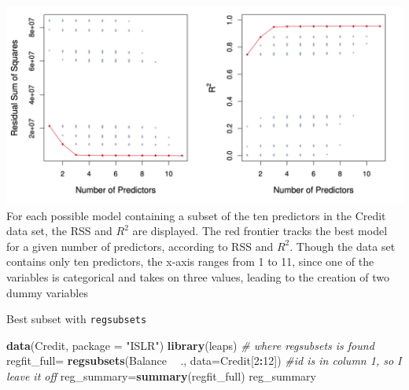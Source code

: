 \documentclass[
]{article}
\newenvironment{Shaded}{\begin{snugshade}}{\end{snugshade}}
\newcommand{\CommentTok}[1]{\textcolor[rgb]{0.56,0.35,0.01}{\textit{#1}}}
\newcommand{\DataTypeTok}[1]{\textcolor[rgb]{0.13,0.29,0.53}{#1}}
\newcommand{\DecValTok}[1]{\textcolor[rgb]{0.00,0.00,0.81}{#1}}
\newcommand{\KeywordTok}[1]{\textcolor[rgb]{0.13,0.29,0.53}{\textbf{#1}}}
\newcommand{\NormalTok}[1]{#1}
\newcommand{\OperatorTok}[1]{\textcolor[rgb]{0.81,0.36,0.00}{\textbf{#1}}}
\newcommand{\StringTok}[1]{\textcolor[rgb]{0.31,0.60,0.02}{#1}}
\begin{document}
\includegraphics[width=33.39in]{images/6.1} For each possible model
containing a subset of the ten predictors in the Credit data set, the
RSS and \(R^2\) are displayed. The red frontier tracks the best model
for a given number of predictors, according to RSS and \(R^2\). Though
the data set contains only ten predictors, the x-axis ranges from 1 to
11, since one of the variables is categorical and takes on three values,
leading to the creation of two dummy variables

Best subset with \texttt{regsubsets}

\begin{Shaded}
\begin{Highlighting}[]
\KeywordTok{data}\NormalTok{(Credit, }\DataTypeTok{package =} \StringTok{"ISLR"}\NormalTok{)}
\KeywordTok{library}\NormalTok{(leaps) }\CommentTok{# where regsubsets is found}
\NormalTok{regfit_full=}\StringTok{ }\KeywordTok{regsubsets}\NormalTok{(Balance }\OperatorTok{~}\StringTok{ }\NormalTok{., }\DataTypeTok{data=}\NormalTok{Credit[}\DecValTok{2}\OperatorTok{:}\DecValTok{12}\NormalTok{]) }\CommentTok{#id is in column 1, so I leave it off}
\NormalTok{reg_summary=}\KeywordTok{summary}\NormalTok{(regfit_full)}
\NormalTok{reg_summary}
\end{Highlighting}
\end{Shaded}
\end{document}
